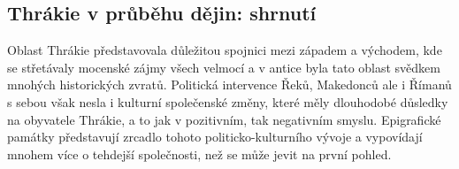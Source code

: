 
\subsection[thrákie-v-průběhu-dějin-shrnutí]{Thrákie v průběhu dějin: shrnutí}

Oblast Thrákie představovala důležitou spojnici mezi západem a východem, kde se střetávaly mocenské zájmy všech velmocí a v antice byla tato oblast svědkem mnohých historických zvratů. Politická intervence Řeků, Makedonců ale i Římanů s sebou však nesla i kulturní společenské změny, které měly dlouhodobé důsledky na obyvatele Thrákie, a to jak v pozitivním, tak negativním smyslu. Epigrafické památky představují zrcadlo tohoto politicko-kulturního vývoje a vypovídají mnohem více o tehdejší společnosti, než se může jevit na první pohled.

